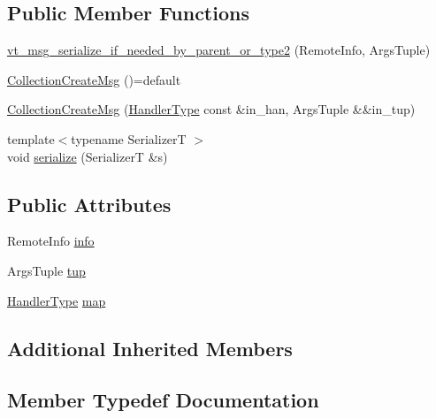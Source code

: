 \subsection*{Public Member Functions}
\begin{DoxyCompactItemize}
\item 
\hyperlink{structvt_1_1vrt_1_1collection_1_1_collection_create_msg_a38d80595f49a4e500caa032cd19ec94f}{vt\+\_\+msg\+\_\+serialize\+\_\+if\+\_\+needed\+\_\+by\+\_\+parent\+\_\+or\+\_\+type2} (Remote\+Info, Args\+Tuple)
\item 
\hyperlink{structvt_1_1vrt_1_1collection_1_1_collection_create_msg_a26a913507e16eabcb1949dc0f01d2b31}{Collection\+Create\+Msg} ()=default
\item 
\hyperlink{structvt_1_1vrt_1_1collection_1_1_collection_create_msg_a9510a76104b8c7d619b0846d3734fa0c}{Collection\+Create\+Msg} (\hyperlink{namespacevt_af64846b57dfcaf104da3ef6967917573}{Handler\+Type} const \&in\+\_\+han, Args\+Tuple \&\&in\+\_\+tup)
\item 
{\footnotesize template$<$typename SerializerT $>$ }\\void \hyperlink{structvt_1_1vrt_1_1collection_1_1_collection_create_msg_a90036f40816bf04321ea62d03a455a47}{serialize} (SerializerT \&s)
\end{DoxyCompactItemize}
\subsection*{Public Attributes}
\begin{DoxyCompactItemize}
\item 
Remote\+Info \hyperlink{structvt_1_1vrt_1_1collection_1_1_collection_create_msg_a7c959b39f6f42a9e174d9658978cf93b}{info}
\item 
Args\+Tuple \hyperlink{structvt_1_1vrt_1_1collection_1_1_collection_create_msg_a5be3c55f9dd0d77e5d576541f204fc26}{tup}
\item 
\hyperlink{namespacevt_af64846b57dfcaf104da3ef6967917573}{Handler\+Type} \hyperlink{structvt_1_1vrt_1_1collection_1_1_collection_create_msg_a72c6c45b7caee61689cd45873d7ef876}{map}
\end{DoxyCompactItemize}
\subsection*{Additional Inherited Members}


\subsection{Member Typedef Documentation}
\mbox{\label{structvt_1_1vrt_1_1collection_1_1_collection_create_msg_abb55583fc386581742c169c93840744f}} 

